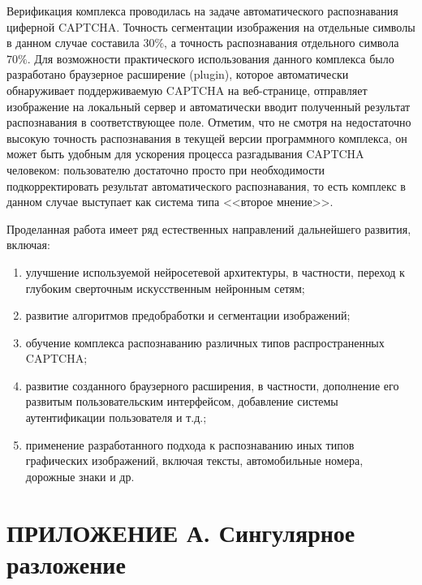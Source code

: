 \documentclass[a4paper,12pt,russian]{article} %
\begin{document}
Верификация комплекса проводилась на задаче автоматического распознавания циферной CAPTCHA.
Точность сегментации изображения на отдельные символы в данном случае составила $30\%$, а точность распознавания отдельного символа $70\%$.
Для возможности практического использования данного комплекса  было разработано браузерное расширение (plugin), которое автоматически обнаруживает поддерживаемую CAPTCHA на веб-странице, отправляет изображение на локальный сервер и автоматически вводит полученный результат распознавания в соответствующее поле.
Отметим, что не смотря на недостаточно высокую точность распознавания в текущей версии программного комплекса, он может быть удобным для ускорения процесса разгадывания CAPTCHA человеком: пользователю достаточно просто при необходимости подкорректировать результат автоматического распознавания, то есть комплекс в данном случае выступает как система типа <<второе мнение>>.

Проделанная работа имеет ряд естественных направлений дальнейшего развития, включая:
\begin{enumerate}
	\item улучшение используемой нейросетевой архитектуры, в частности, переход к глубоким сверточным искусственным нейронным сетям;
	\item развитие алгоритмов предобработки и сегментации изображений;
	\item обучение комплекса распознаванию различных типов распространенных CAPTCHA;
	\item развитие созданного браузерного расширения, в частности, дополнение его развитым пользовательским интерфейсом, добавление системы аутентификации пользователя и т.д.;
	\item применение разработанного подхода к распознаванию иных типов графических изображений, включая тексты, автомобильные номера, дорожные знаки и др.
\end{enumerate}

\newpage
{}
\renewcommand\refname{\Large\centering СПИСОК ИСПОЛЬЗОВАННЫХ ИСТОЧНИКОВ}


\newpage
\section*{ПРИЛОЖЕНИЕ А. Сингулярное разложение} \label{app:svd}
\end{document}
